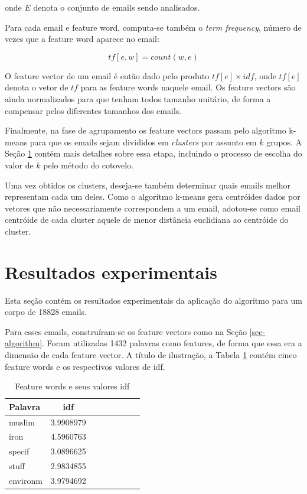 \documentclass[10pt,twocolumn,letterpaper]{article}
\begin{document}
onde $E$ denota o conjunto de emails sendo analisados.

Para cada email e feature word, computa-se também o \emph{term frequency}, número de vezes que a feature word aparece no email:

\begin{displaymath}
tf[e, w] = count(w, e)
\end{displaymath}

O feature vector de um email é então dado pelo produto $tf[e] \times idf$, onde $tf[e]$ denota o vetor de $tf$ para as feature words naquele email. Os feature vectors são ainda normalizados para que tenham todos tamanho unitário, de forma a compensar pelos diferentes tamanhos dos emails.

Finalmente, na fase de agrupamento os feature vectors passam pelo algoritmo k-means para que os emails sejam divididos em \emph{clusters} por assunto em $k$ grupos. A Seção \ref{sec-experiments} contém mais detalhes sobre essa etapa, incluindo o processo de escolha do valor de $k$ pelo método do cotovelo.

Uma vez obtidos os clusters, deseja-se também determinar quais emails melhor representam cada um deles. Como o algoritmo k-means gera centróides dados por vetores que não necessariamente correspondem a um email, adotou-se como email centróide de cada cluster aquele de menor distância euclidiana ao centróide do cluster.

\section{Resultados experimentais}
\label{sec-experiments}

Esta seção contém os resultados experimentais da aplicação do algoritmo para um corpo de 18828 emails.

Para esses emails, construíram-se os feature vectors como na Seção \ref{sec-algorithm}. Foram utilizadas 1432 palavras como features, de forma que essa era a dimensão de cada feature vector. A título de ilustração, a Tabela \ref{tbl-feature-words} contém cinco feature words e os respectivos valores de idf.

\begin{table}
\begin{center}
\begin{tabular}{l*{6}{c}r}
Palavra & idf  \\
\hline
muslim & 3.9908979 \\
iron & 4.5960763 \\
specif & 3.0896625 \\
stuff & 2.9834855 \\
environm & 3.9794692 \\
\end{tabular}
\end{center}
\caption{Feature words e seus valores idf}
\label{tbl-feature-words}
\end{table}
\end{document}

